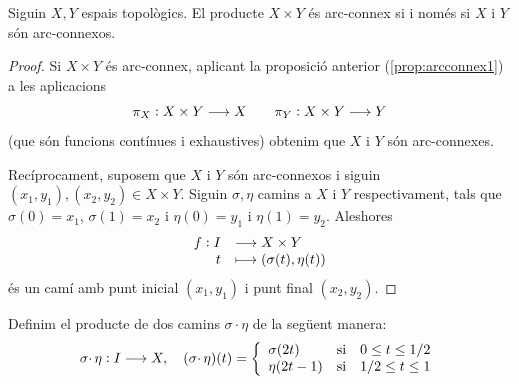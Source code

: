 \documentclass[../main.tex]{subfiles}
\begin{document}
\begin{prop}
\label{prop:arcconnex2} Siguin $X,Y$ espais topològics. El producte $X\times Y$ és arc-connex si i només si $X$ i $Y$ són arc-connexos.
\end{prop}
\begin{proof}
Si $X\times Y$ és arc-connex, aplicant la proposició anterior (\ref{prop:arcconnex1}) a les aplicacions
\begin{equation}
    \notag
    \pi_X:X\times Y\longrightarrow X\qquad \pi_Y:X\times Y\longrightarrow Y
\end{equation}
(que són funcions contínues i exhaustives) obtenim que $X$ i $Y$ són arc-connexes.

Recíprocament, suposem que $X$ i $Y$ són arc-connexos i siguin $(x_1,y_1),(x_2,y_2)\in X\times Y$. Siguin $\sigma,\eta$ camins a $X$ i $Y$ respectivament, tals que $\sigma(0) = x_1$, $\sigma(1) = x_2$ i $\eta(0) = y_1$ i $\eta(1) = y_2$. Aleshores
\begin{equation}
    \notag
    \begin{array}{rl}
        f:I & \longrightarrow X\times Y \\
        t & \longmapsto (\sigma(t),\eta(t))
    \end{array}
\end{equation}
és un camí amb punt inicial $(x_1,y_1)$ i punt final $(x_2,y_2)$.
\end{proof}

\begin{defi}
\label{def:productedecamins} Definim el producte de dos camins $\sigma\cdotp\eta$ de la següent manera:
\begin{equation}
    \notag
    \sigma\cdotp\eta:I\longrightarrow X,\quad (\sigma\cdotp\eta)(t) = \left\{
    \begin{array}{lll}
        \sigma(2t) & \text{si} & 0\leq t\leq 1/2 \\
        \eta(2t-1) & \text{si} & 1/2\leq t\leq 1
    \end{array}
    \right.
\end{equation}
\end{defi}
\end{document}
